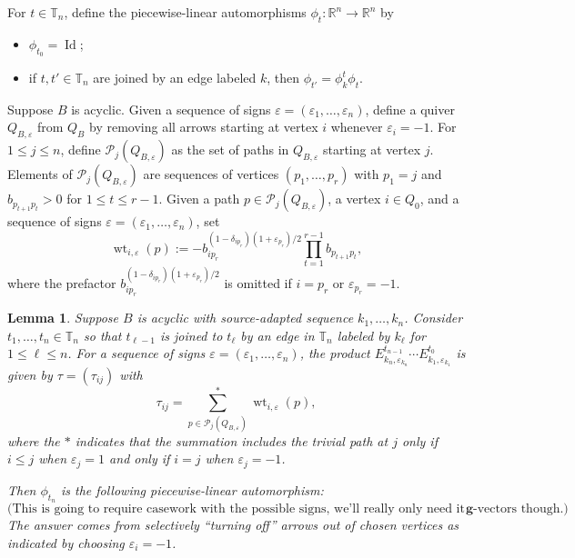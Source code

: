 \documentclass{amsart}
\newtheorem{lemma}[theorem]{Lemma}
\numberwithin{theorem}{section}
\newcommand{\bfg}{\boldsymbol{g}}
\newcommand{\cP}{\mathcal{P}}
\newcommand{\RR}{\mathbb{R}}
\newcommand{\TT}{\mathbb{T}}
\newcommand{\Id}{\operatorname{Id}}
\newcommand{\wt}{{\operatorname{wt}}}
\begin{document}
  For $t\in\TT_n$, define the piecewise-linear automorphisms $\phi_t:\RR^n\to\RR^n$ by
  \begin{itemize}
    \item $\phi_{t_0}=\Id$;
    \item if $t,t'\in\TT_n$ are joined by an edge labeled $k$, then $\phi_{t'}=\phi^t_k \phi_t$.
  \end{itemize}

  Suppose $B$ is acyclic.
  Given a sequence of signs $\varepsilon=(\varepsilon_1,\ldots,\varepsilon_n)$, define a quiver $Q_{B,\varepsilon}$ from $Q_B$ by removing all arrows starting at vertex $i$ whenever $\varepsilon_i=-1$.
  For $1\le j\le n$, define $\cP_j(Q_{B,\varepsilon})$ as the set of paths in $Q_{B,\varepsilon}$ starting at vertex $j$.
  Elements of $\cP_j(Q_{B,\varepsilon})$ are sequences of vertices $(p_1,\ldots,p_r)$ with $p_1=j$ and $b_{p_{t+1}p_t}>0$ for $1\le t\le r-1$.
  Given a path $p\in\cP_j(Q_{B,\varepsilon})$, a vertex $i\in Q_0$, and a sequence of signs $\varepsilon=(\varepsilon_1,\ldots,\varepsilon_n)$, set
  \[\wt_{i,\varepsilon}(p):=-b_{ip_r}^{(1-\delta_{ip_r})(1+\varepsilon_{p_r})/2}\prod_{t=1}^{r-1} b_{p_{t+1}p_t},\]
  where the prefactor $b_{ip_r}^{(1-\delta_{ip_r})(1+\varepsilon_{p_r})/2}$ is omitted if $i=p_r$ or $\varepsilon_{p_r}=-1$.
  \begin{lemma}
    Suppose $B$ is acyclic with source-adapted sequence $k_1,\ldots,k_n$.
    Consider $t_1,\ldots,t_n\in\TT_n$ so that $t_{\ell-1}$ is joined to $t_\ell$ by an edge in $\TT_n$ labeled by $k_\ell$ for $1\le\ell\le n$.
    For a sequence of signs $\varepsilon=(\varepsilon_1,\ldots,\varepsilon_n)$, the product $E^{t_{n-1}}_{k_n,\varepsilon_{k_n}}\cdots E^{t_0}_{k_1,\varepsilon_{k_1}}$ is given by $\tau=(\tau_{ij})$ with
    \begin{equation}
      \label{eq:tropical twist}
      \tau_{ij}=\sum_{p\in\cP_j(Q_{B,\varepsilon})}^* \wt_{i,\varepsilon}(p),
    \end{equation}
    where the $*$ indicates that the summation includes the trivial path at $j$ only if $i\le j$ when $\varepsilon_j=1$ and only if $i=j$ when $\varepsilon_j=-1$.

    Then $\phi_{t_n}$ is the following piecewise-linear automorphism:
    \begin{equation}
      \label{eq:tropical twist}
      \text{(This is going to require casework with the possible signs, we'll really only need it for imaginary $\bfg$-vectors though.)}
    \end{equation}
    The answer comes from selectively ``turning off'' arrows out of chosen vertices as indicated by choosing $\varepsilon_i=-1$.
  \end{lemma}
\end{document}
